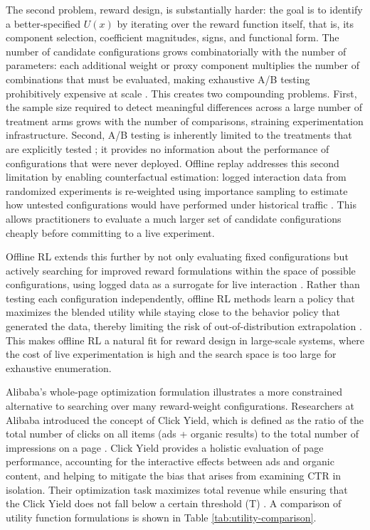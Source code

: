 \documentclass[manuscript,review,screen]{acmart}
\begin{document}
The second problem, reward design, is substantially harder: the goal is to identify a better-specified $U(x)$ by iterating over the reward function itself, that is, its component selection, coefficient magnitudes, signs, and functional form. The number of candidate configurations grows combinatorially with the number of parameters: each additional weight or proxy component multiplies the number of combinations that must be evaluated, making exhaustive A/B testing prohibitively expensive at scale \cite{gauci2018horizon}. This creates two compounding problems. First, the sample size required to detect meaningful differences across a large number of treatment arms grows with the number of comparisons, straining experimentation infrastructure. Second, A/B testing is inherently limited to the treatments that are explicitly tested \cite{swaminathan2015counterfactual, dudik2011doubly}; it provides no information about the performance of configurations that were never deployed. Offline replay addresses this second limitation by enabling counterfactual estimation: logged interaction data from randomized experiments is re-weighted using importance sampling to estimate how untested configurations would have performed under historical traffic \cite{levine2020offline, swaminathan2015counterfactual, dudik2011doubly}. This allows practitioners to evaluate a much larger set of candidate configurations cheaply before committing to a live experiment.

Offline RL extends this further by not only evaluating fixed configurations but actively searching for improved reward formulations within the space of possible configurations, using logged data as a surrogate for live interaction \cite{levine2020offline}. Rather than testing each configuration independently, offline RL methods learn a policy that maximizes the blended utility while staying close to the behavior policy that generated the data, thereby limiting the risk of out-of-distribution extrapolation \cite{levine2020offline, chen2022off}. This makes offline RL a natural fit for reward design in large-scale systems, where the cost of live experimentation is high and the search space is too large for exhaustive enumeration.

Alibaba's whole-page optimization formulation illustrates a more constrained alternative to searching over many reward-weight configurations. Researchers at Alibaba introduced the concept of Click Yield, which is defined as the ratio of the total number of clicks on all items (ads + organic results) to the total number of impressions on a page \cite{zhang2018whole}. Click Yield provides a holistic evaluation of page performance, accounting for the interactive effects between ads and organic content, and helping to mitigate the bias that arises from examining CTR in isolation. Their optimization task maximizes total revenue while ensuring that the Click Yield does not fall below a certain threshold (T) \cite{zhang2018whole}. A comparison of utility function formulations is shown in Table \ref{tab:utility-comparison}.
\end{document}
